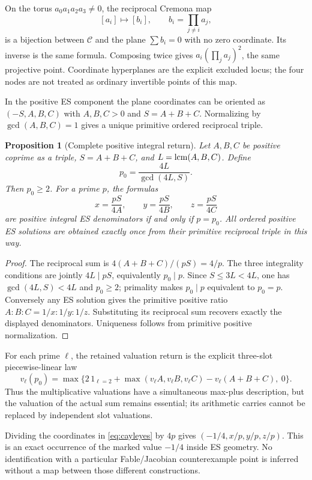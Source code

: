 \documentclass[11pt,reqno]{amsart}
\newtheorem{proposition}[theorem]{Proposition}
\theoremstyle{definition}\newtheorem{definition}[theorem]{Definition}
\theoremstyle{remark}\newtheorem{remark}[theorem]{Remark}
\begin{document}
On the torus $a_0a_1a_2a_3\ne0$, the reciprocal Cremona map
\[
 [a_i]\longmapsto[b_i],\qquad b_i=\prod_{j\ne i}a_j,
\]
is a bijection between $\mathscr C$ and the plane $\sum b_i=0$ with no zero
coordinate. Its inverse is the same formula. Composing twice gives
$a_i(\prod_ja_j)^2$, the same projective point. Coordinate hyperplanes are the
explicit excluded locus; the four nodes are not treated as ordinary invertible
points of this map.

In the positive ES component the plane coordinates can be oriented as
$(-S,A,B,C)$ with $A,B,C>0$ and $S=A+B+C$. Normalizing by
$\gcd(A,B,C)=1$ gives a unique primitive ordered reciprocal triple.

\begin{proposition}[Complete positive integral return]\label{prop:prime-return}
Let $A,B,C$ be positive coprime as a triple, $S=A+B+C$, and
$L=\operatorname{lcm}(A,B,C)$. Define
\[
 p_0=\frac{4L}{\gcd(4L,S)}.
\]
Then $p_0\ge2$. For a prime $p$, the formulas
\[
 x=\frac{pS}{4A},\qquad y=\frac{pS}{4B},\qquad z=\frac{pS}{4C}
\]
are positive integral ES denominators if and only if $p=p_0$.
All ordered positive ES solutions are obtained exactly once from their
primitive reciprocal triple in this way.
\end{proposition}
\begin{proof}
The reciprocal sum is $4(A+B+C)/(pS)=4/p$. The three integrality conditions
are jointly $4L\mid pS$, equivalently $p_0\mid p$. Since
$S\le3L<4L$, one has $\gcd(4L,S)<4L$ and $p_0\ge2$; primality makes
$p_0\mid p$ equivalent to $p_0=p$. Conversely any ES solution gives the
primitive positive ratio $A:B:C=1/x:1/y:1/z$. Substituting its reciprocal sum
recovers exactly the displayed denominators. Uniqueness follows from primitive
positive normalization.
\end{proof}

For each prime $\ell$, the retained valuation return is the explicit three-slot
piecewise-linear law
\[
 v_\ell(p_0)=\max\{2\,1_{\ell=2}+\max(v_\ell A,v_\ell B,v_\ell C)
                         -v_\ell(A+B+C),\ 0\}.
\]
Thus the multiplicative valuations have a simultaneous max-plus description,
but the valuation of the actual sum remains essential; its arithmetic carries
cannot be replaced by independent slot valuations.

Dividing the coordinates in \eqref{eq:cayleyes} by $4p$ gives
$(-1/4,x/p,y/p,z/p)$. This is an exact occurrence of the marked value $-1/4$
inside ES geometry. No identification with a particular Fable/Jacobian
counterexample point is inferred without a map between those different
constructions.
\end{document}
